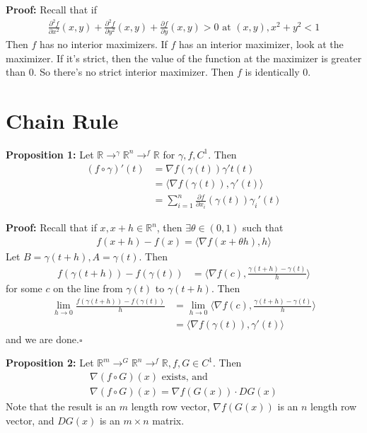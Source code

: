\documentclass{article}
\newcommand*{\qed}{\hfill$\square$}%
\newcommand*{\txt}[1]{\text{ #1 }}%
\newcommand*{\iprod}[1]{\langle #1 \rangle}
\newcommand*{\rr}{\mathbb{R}}%
\begin{document}
\textbf{Proof:} Recall that if \begin{align*}
    \frac{\partial^2 f}{\partial x^2}(x,y)+\frac{\partial^2 f}{\partial y^2}(x,y)+\frac{\partial f}{\partial y}(x,y)>0\txt{at}(x,y),x^2+y^2<1
\end{align*} Then $f$ has no interior maximizers. If $f$ has an interior maximizer, look at the maximizer. If it's strict, then the value of the function at the maximizer is greater than 0. So there's no strict interior maximizer. Then $f$ is identically 0.

\section{Chain Rule}

\textbf{Proposition 1:} Let $\rr\to^\gamma \rr^n\to^f\rr$ for $\gamma,f,C^1$. Then \begin{align*}
    (f\circ\gamma)'(t)&=\nabla f(\gamma(t))\gamma't(t)\\
    &=\iprod{\nabla f(\gamma(t)),\gamma'(t)}\\
    &=\sum_{i=1}^{n}\frac{\partial f}{\partial x_i}(\gamma(t))\gamma_i'(t)
\end{align*}

\textbf{Proof:} Recall that if $x, x+h\in \rr^n$, then $\exists \theta\in (0,1)$ such that \begin{align*}
    f(x+h)-f(x)=\iprod{\nabla f(x+\theta h),h}
\end{align*} Let $B=\gamma(t+h), A=\gamma(t)$. Then \begin{align*}
    f(\gamma(t+h))-f(\gamma(t))&=\iprod{\nabla f(c),\frac{\gamma(t+h)-\gamma(t)}{h}}
\end{align*} for some $c$ on the line from $\gamma(t)$ to $\gamma(t+h)$. Then \begin{align*}
    \lim_{h\to 0}\frac{f(\gamma(t+h))-f(\gamma(t))}{h}&=\lim_{h\to 0}\iprod{\nabla f(c),\frac{\gamma(t+h)-\gamma(t)}{h}}\\
    &=\iprod{\nabla f(\gamma(t)),\gamma'(t)}
\end{align*} and we are done.\qed 

\textbf{Proposition 2:} Let $\rr^m\to^G\rr^n\to^f\rr,f,G\in C^1$. Then \begin{align*}
    \nabla(f\circ G)(x)\txt{exists, and}\\
    \nabla(f\circ G)(x)=\nabla f(G(x))\cdot DG(x)
\end{align*} Note that the result is an $m$ length row vector, $\nabla f(G(x))$ is an $n$ length row vector, and $DG(x)$ is an $m\times n$ matrix.
\end{document}
